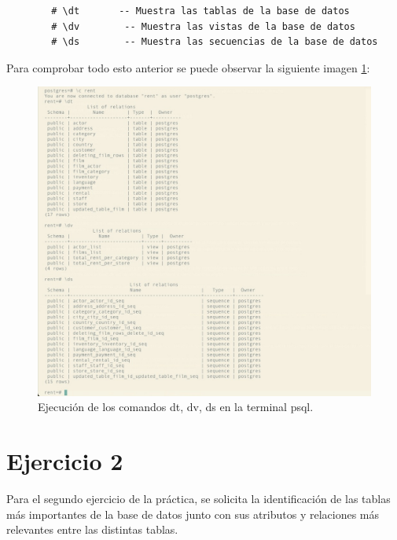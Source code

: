 \documentclass[10pt]{report}
\begin{document}
	\begin{verbatim}
		# \dt 		-- Muestra las tablas de la base de datos 
		# \dv		 -- Muestra las vistas de la base de datos
		# \ds		 -- Muestra las secuencias de la base de datos
	\end{verbatim}

	Para comprobar todo esto anterior se puede observar la siguiente imagen \ref{fig:Exercice-1}:

	\begin{figure}[H]
    \centering
    \includegraphics[scale=0.4]{img/Exercice-1-Comprobation.jpeg}
    \caption{Ejecución de los comandos dt, dv, ds en la terminal psql.}
    \label{fig:Exercice-1}
  \end{figure}

	\section{Ejercicio 2}
	Para el segundo ejercicio de la práctica, se solicita la identificación de las tablas más importantes de la base de datos junto con sus atributos y relaciones más relevantes entre las distintas tablas.
\\	
\end{document}
